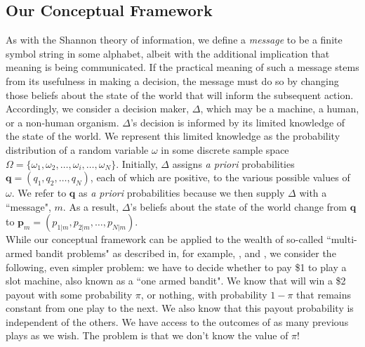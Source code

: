 \documentclass[11pt]{article}
\begin{document}
\subsection{Our Conceptual Framework}
As with the Shannon theory of information, we define a {\it message} to be a finite symbol string in some alphabet, albeit with the additional implication that meaning is being communicated.   
If the practical meaning of such a message stems from its usefulness in making a decision, the message must do so by changing those beliefs about the state of the world that will inform the subsequent action.  Accordingly, we consider a decision maker, $\Delta$, which may be a machine, a human, or a non-human organism.  $\Delta$'s decision is informed by its limited knowledge of the state of the world.  We represent this limited knowledge as the probability distribution of a random variable $\omega$ in some discrete sample space $\Omega =\{\omega_1, \omega_2, \ldots, \omega_i,\ldots, \omega_N \}$.  Initially, 
$\Delta$ assigns {\it a priori} probabilities  $\mathbf q = ( q_1, q_2, \ldots, q_N)$, each of which are positive, to the various possible values of $\omega$.  We
refer to $\mathbf q$ as {\it a priori} probabilities because we then supply $\Delta$ with a ``message", $m$.  As a result, $\Delta$'s beliefs about the state of the world change from $\mathbf q$ to 
$\mathbf p_m = ( p_{1|m}, p_{2|m}, \ldots, p_{N|m})$.\\  

While our conceptual framework can be applied to the wealth of so-called ``multi-armed bandit problems" 
as described in, for example, \cite{Robbins}, \cite{exploit} and \cite{MultiarmedBanditBook}, 
we consider the following, even 
simpler problem:  we have to decide whether to pay \$1 to play a slot machine, also known as a ``one 
armed bandit".  We know that will win a \$2 payout with some 
probability $\pi$, or nothing, with probability $1 - \pi$ that remains constant from one play to the next.
We also know that this payout probability is independent of the others.  We have access to the outcomes 
of as many previous plays as we wish.  The problem is that we don't know the value of $\pi$!\\
\end{document}
